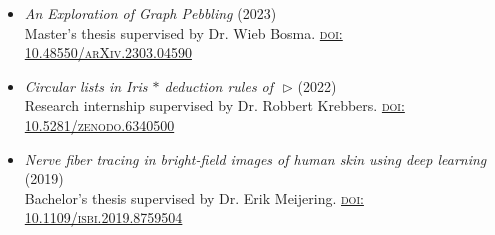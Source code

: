 \documentclass[a4paper,12pt]{article}
\begin{document}
\begin{itemize}[--,labelsep=3mm,leftmargin=*]
\item \emph{An Exploration of Graph Pebbling} (2023)\\
Master's thesis supervised by Dr. Wieb Bosma. \textsc{\href{https://arxiv.org/abs/2303.04590}{doi: 10.48550/arXiv.2303.04590}}
\item \emph{Circular lists in Iris $\ast$ deduction rules of~\,$\triangleright$} (2022)\\
Research internship supervised by Dr. Robbert Krebbers. \textsc{\href{https://doi.org/10.5281/zenodo.6340500}{doi: 10.5281/zenodo.6340500}}
\item \emph{Nerve fiber tracing in bright-field images of human skin using deep learning} (2019)\\
Bachelor's thesis supervised by Dr. Erik Meijering. \textsc{\href{https://ieeexplore.ieee.org/document/8759504}{doi: 10.1109/isbi.2019.8759504}}
\end{itemize}
\end{document}
